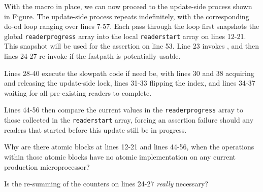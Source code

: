 With the  macro in place, we can now proceed
to the update-side process shown in
Figure.
The update-side process repeats indefinitely, with the corresponding
do-od loop ranging over lines 7-57.
Each pass through the loop first snapshots the global {\tt readerprogress}
array into the local {\tt readerstart} array on lines 12-21.
This snapshot will be used for the assertion on line 53.
Line 23 invokes , and then lines 24-27
re-invoke  if the fastpath is potentially
usable.

Lines 28-40 execute the slowpath code if need be, with
lines 30 and 38 acquiring and releasing the update-side lock,
lines 31-33 flipping the index, and lines 34-37 waiting for
all pre-existing readers to complete.

Lines 44-56 then compare the current values in the {\tt readerprogress}
array to those collected in the {\tt readerstart} array,
forcing an assertion failure should any readers that started before
this update still be in progress.

\QuickQuiz{}
	Why are there atomic blocks at lines 12-21
	and lines 44-56, when the operations within those atomic
	blocks have no atomic implementation on any current
	production microprocessor?
 \QuickQuizEnd

\QuickQuiz{}
	Is the re-summing of the counters on lines 24-27
	\emph{really} necessary?
 \QuickQuizEnd

